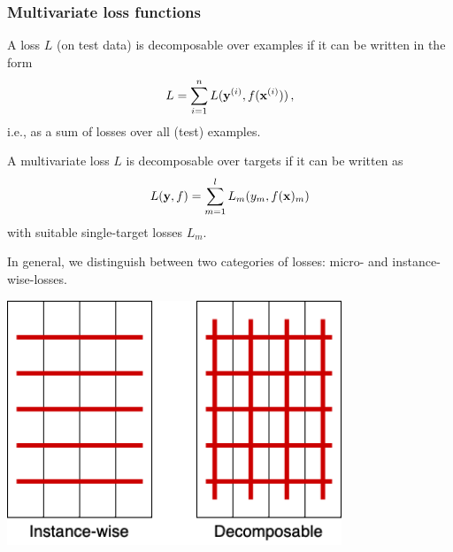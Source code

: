 \documentclass[11pt,compress,t,notes=noshow, xcolor=table]{beamer}
\begin{document}
\begin{frame}
	\frametitle{Multivariate loss functions}
	\small
	\begin{itemize}
%		
%
		\item A loss $L$ (on test data) is decomposable over examples if it can be written in the form
		$$
		L = \sum_{i=1}^n L(\mathbf{y}^{(i)}, f(\mathbf{x}^{(i)})) 
		\, ,
		$$
		i.e., as a sum of losses over all (test) examples. 
		
		
		\item A multivariate loss $L$ is decomposable over targets if it can be written as
		$$
		L(\mathbf{y}, f) = \sum_{m=1}^l L_m(y_m, f(\mathbf{x})_m) 
		$$
		with suitable single-target losses $L_m$. 
		
%		

		\begin{minipage}{0.45\textwidth}
%			
			\item  In general, we distinguish between two categories of losses: micro- and instance-wise-losses. 
%			
		\end{minipage}
%	
		\begin{minipage}{0.45\textwidth}
			\begin{center}
				\includegraphics[width=0.75\textwidth]{figure/fmeasure}
			\end{center}
		\end{minipage}
%		
	\end{itemize}
%
\end{frame}
\end{document}
